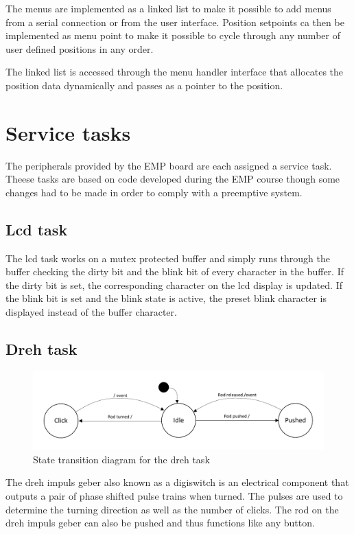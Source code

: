 The menus are implemented as a linked list to make it possible to add menus from a serial connection or from the user interface. Position setpoints ca then be implemented as menu point to make it possible to cycle through any number of user defined positions in any order.

The linked list is accessed through the menu handler interface that allocates the position data dynamically and passes as a pointer to the position.

\section{Service tasks}
The peripherals provided by the EMP board are each assigned a service task. Theese tasks are based on code developed during the EMP course though some changes had to be made in order to comply with a preemptive system. 

\subsection{Lcd task}
The lcd task works on a mutex protected buffer and simply runs through the buffer checking the dirty bit and the blink bit of every character in the buffer. If the dirty bit is set, the corresponding character on the lcd display is updated. If the blink bit is set and the blink state is active, the preset blink character is displayed instead of the buffer character.

\subsection{Dreh task}
\begin{figure}[htb]
	\centering
	\includegraphics[width=\textwidth,trim=0 0 0 0]{graphics/dreh_task_fsm.pdf} 
	\caption{State transition diagram for the dreh task}
	\label{fig:task_dreh_fsm}
\end{figure}
The dreh impuls geber also known as a digiswitch is an electrical component that outputs a pair of phase shifted pulse trains when turned. The pulses are used to determine the turning direction as well as the number of clicks. The rod on the dreh impuls geber can also be pushed and thus functions like any button.

